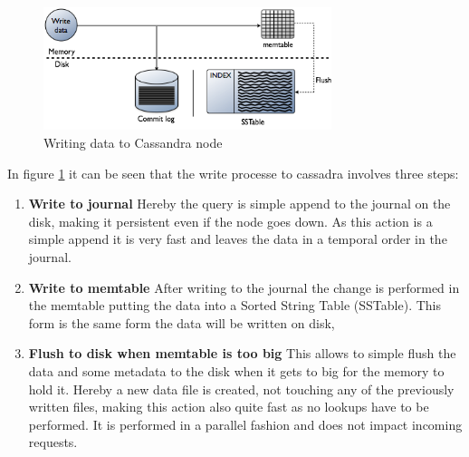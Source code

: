 \begin{figure}[ht]
    \centering
    \includegraphics[width=0.75\textwidth]{img/cassandra_local_write.png}
    \caption{Writing data to Cassandra node \autocite{datastaxWriteData}}
    \label{fig:cassandra:writeData}
\end{figure}
In figure \ref{fig:cassandra:writeData} it can be seen that the write processe to cassadra involves three steps:
\begin{enumerate}
\item \textbf{Write to journal} Hereby the query is simple append to the journal on the disk, making it persistent even if the node goes down. As this action is a simple append it is very fast and leaves the data in a temporal order in the journal.
\item \textbf{Write to memtable} After writing to the journal the change is performed in the memtable putting the data into a Sorted String Table (SSTable). This form is the same form the data will be written on disk,
\item \textbf{Flush to disk when memtable is too big} This allows to simple flush the data and some metadata to the disk when it gets to big for the memory to hold it. Hereby a new data file is created, not touching any of the previously written files, making this action also quite fast as no lookups have to be performed. It is performed in a parallel fashion and does not impact incoming requests.
\end{enumerate}

